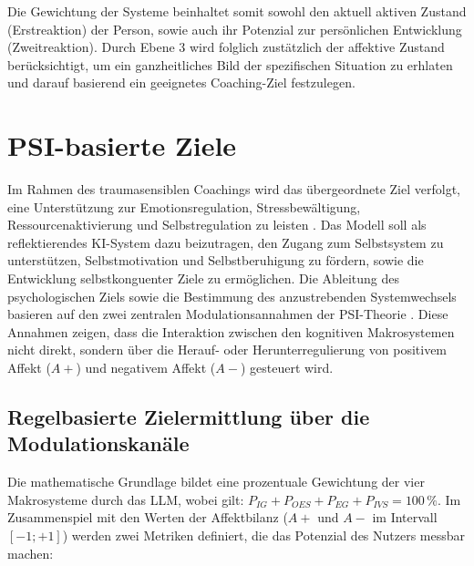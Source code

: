 Die Gewichtung der Systeme beinhaltet somit sowohl den aktuell aktiven Zustand (Erstreaktion) der Person, sowie auch ihr Potenzial zur persönlichen Entwicklung (Zweitreaktion). Durch Ebene 3 wird folglich zustätzlich der affektive Zustand berücksichtigt, um ein ganzheitliches Bild der spezifischen Situation zu erhlaten und darauf basierend ein geeignetes Coaching-Ziel festzulegen.


\section{PSI-basierte Ziele}
Im Rahmen des traumasensiblen Coachings wird das übergeordnete Ziel verfolgt, eine Unterstützung zur Emotionsregulation, Stressbewältigung, Ressourcenaktivierung und Selbstregulation zu leisten \citep{kuhl2005neue}. Das Modell soll als reflektierendes KI-System dazu beizutragen, den Zugang zum Selbstsystem zu unterstützen, Selbstmotivation und Selbstberuhigung zu fördern, sowie die Entwicklung selbstkonguenter Ziele zu ermöglichen.
Die Ableitung des psychologischen Ziels sowie die Bestimmung des anzustrebenden Systemwechsels basieren auf den zwei zentralen Modulationsannahmen der PSI-Theorie \citep{Kuhl2000The}. Diese Annahmen zeigen, dass die Interaktion zwischen den kognitiven Makrosystemen nicht direkt, sondern über die Herauf- oder Herunterregulierung von positivem Affekt ($A+$) und negativem Affekt ($A-$) gesteuert wird.

\subsection{Regelbasierte Zielermittlung über die Modulationskanäle}
Die mathematische Grundlage bildet eine prozentuale Gewichtung der vier Makrosysteme durch das LLM, wobei gilt: $P_{IG} + P_{OES} + P_{EG} + P_{IVS} = 100\,\%$. Im Zusammenspiel mit den Werten der Affektbilanz ($A+$ und $A-$ im Intervall $[-1; +1]$) werden zwei Metriken definiert, die das Potenzial des Nutzers messbar machen:

